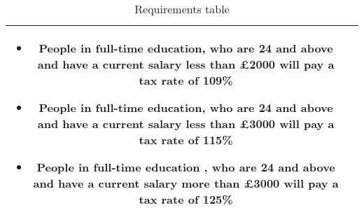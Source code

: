 \begin{table}[H]
\begin{tabularx}{\textwidth}{| c | X |}
    \begin{itemize}[itemsep=\tableitemsep, leftmargin=\tableleftsep]
    \item People in full-time education, who are 24 and above and have a current salary less than £2000 will pay a tax rate of 109\%
    \item People in full-time education, who are 24 and above and have a current salary less than £3000 will pay a tax rate of 115\%
    \item People in full-time education , who are 24 and above and have a current salary more than £3000 will pay a tax rate of 125\%
    \end{itemize}
    \\
    \hline %
\end{tabularx}
\caption{Requirements table}
\end{table}
